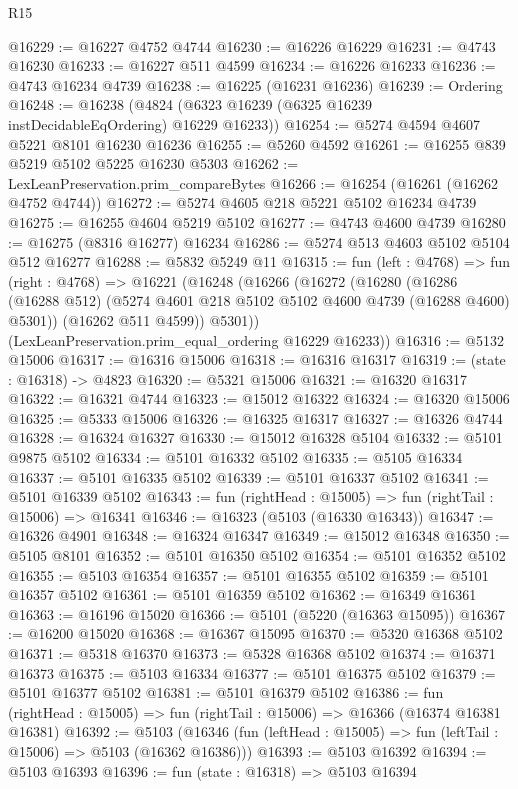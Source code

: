 \begin{lexlean}{R15}
\begin{coremodule}
{{{{{{{{{{{@16229 := @16227 @4752 @4744
@16230 := @16226 @16229
@16231 := @4743 @16230
@16233 := @16227 @511 @4599
@16234 := @16226 @16233
@16236 := @4743 @16234 @4739
@16238 := @16225 (@16231 @16236)
@16239 := Ordering
@16248 := @16238 (@4824 (@6323 @16239 (@6325 @16239 instDecidableEqOrdering) @16229 @16233))
@16254 := @5274 @4594 @4607 @5221 @8101 @16230 @16236
@16255 := @5260 @4592
@16261 := @16255 @839 @5219 @5102 @5225 @16230 @5303
@16262 := LexLeanPreservation.prim_compareBytes
@16266 := @16254 (@16261 (@16262 @4752 @4744))
@16272 := @5274 @4605 @218 @5221 @5102 @16234 @4739
@16275 := @16255 @4604 @5219 @5102
@16277 := @4743 @4600 @4739
@16280 := @16275 (@8316 @16277) @16234
@16286 := @5274 @513 @4603 @5102 @5104 @512 @16277
@16288 := @5832 @5249 @11
@16315 := fun (left : @4768) =>
  fun (right : @4768) =>
  @16221
    (@16248
      (@16266
        (@16272
          (@16280
            (@16286 (@16288 @512) (@5274 @4601 @218 @5102 @5102 @4600 @4739 (@16288 @4600) @5301))
            (@16262 @511 @4599))
          @5301))
      (LexLeanPreservation.prim_equal_ordering @16229 @16233))
@16316 := @5132 @15006
@16317 := @16316 @15006
@16318 := @16316 @16317
@16319 := (state : @16318) -> @4823
@16320 := @5321 @15006
@16321 := @16320 @16317
@16322 := @16321 @4744
@16323 := @15012 @16322
@16324 := @16320 @15006
@16325 := @5333 @15006
@16326 := @16325 @16317
@16327 := @16326 @4744
@16328 := @16324 @16327
@16330 := @15012 @16328 @5104
@16332 := @5101 @9875 @5102
@16334 := @5101 @16332 @5102
@16335 := @5105 @16334
@16337 := @5101 @16335 @5102
@16339 := @5101 @16337 @5102
@16341 := @5101 @16339 @5102
@16343 := fun (rightHead : @15005) => fun (rightTail : @15006) => @16341
@16346 := @16323 (@5103 (@16330 @16343))
@16347 := @16326 @4901
@16348 := @16324 @16347
@16349 := @15012 @16348
@16350 := @5105 @8101
@16352 := @5101 @16350 @5102
@16354 := @5101 @16352 @5102
@16355 := @5103 @16354
@16357 := @5101 @16355 @5102
@16359 := @5101 @16357 @5102
@16361 := @5101 @16359 @5102
@16362 := @16349 @16361
@16363 := @16196 @15020
@16366 := @5101 (@5220 (@16363 @15095))
@16367 := @16200 @15020
@16368 := @16367 @15095
@16370 := @5320 @16368 @5102
@16371 := @5318 @16370
@16373 := @5328 @16368 @5102
@16374 := @16371 @16373
@16375 := @5103 @16334
@16377 := @5101 @16375 @5102
@16379 := @5101 @16377 @5102
@16381 := @5101 @16379 @5102
@16386 := fun (rightHead : @15005) => fun (rightTail : @15006) => @16366 (@16374 @16381 @16381)
@16392 := @5103
    (@16346 (fun (leftHead : @15005) => fun (leftTail : @15006) => @5103 (@16362 @16386)))
@16393 := @5103 @16392
@16394 := @5103 @16393
@16396 := fun (state : @16318) => @5103 @16394
}}}}}}}}}}}
\end{coremodule}
\end{lexlean}

